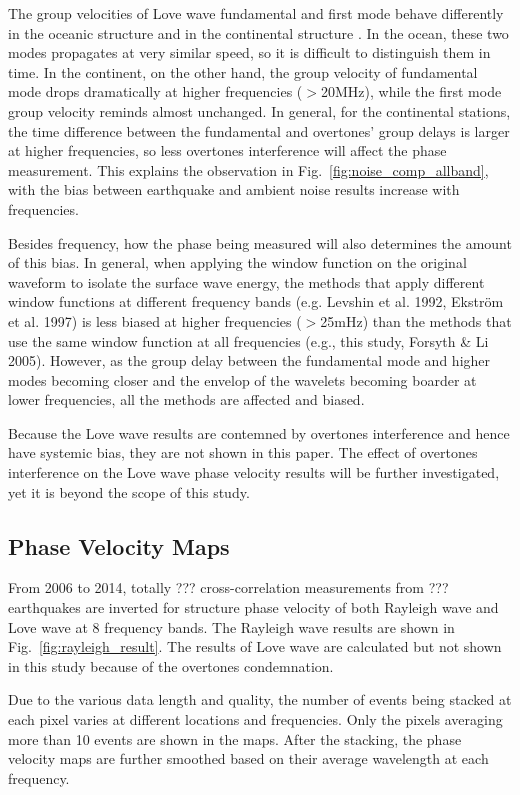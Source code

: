 \documentclass[referee]{gji}
\begin{document}
The group velocities of Love wave fundamental and first mode behave differently in the oceanic structure and in the continental structure \cite{Nettles:2011}. In the ocean, these two modes propagates at very similar speed, so it is difficult to distinguish them in time. In the continent, on the other hand, the group velocity of fundamental mode drops dramatically at higher frequencies ($>$20MHz), while the first mode group velocity reminds almost unchanged. In general, for the continental stations, the time difference between the fundamental and overtones’ group delays is larger at higher frequencies, so less overtones interference will affect the phase measurement. This explains the observation in Fig.~\ref{fig:noise_comp_allband}, with the bias between earthquake and ambient noise results increase with frequencies. 

Besides frequency, how the phase being measured will also determines the amount of this bias. In general, when applying the window function on the original waveform to isolate the surface wave energy, the methods that apply different window functions at different frequency bands (e.g. Levshin et al. 1992, Ekstr\"{o}m et al. 1997) is less biased at higher frequencies ($>$25mHz) than the methods that use the same window function at all frequencies (e.g., this study, Forsyth \& Li 2005). However, as the group delay between the fundamental mode and higher modes becoming closer and the envelop of the wavelets becoming boarder at lower frequencies, all the methods are affected and biased.

Because the Love wave results are contemned by overtones interference and hence have systemic bias, they are not shown in this paper. The effect of overtones interference on the Love wave phase velocity results will be further investigated, yet it is beyond the scope of this study.

\subsection{Phase Velocity Maps}

From 2006 to 2014, totally ??? cross-correlation measurements from ??? earthquakes are inverted for structure phase velocity of both Rayleigh wave and Love wave at 8 frequency bands. The Rayleigh wave results are shown in Fig.~\ref{fig:rayleigh_result}. The results of Love wave are calculated but not shown in this study because of the overtones condemnation. 

Due to the various data length and quality, the number of events being stacked at each pixel varies at different locations and frequencies. Only the pixels averaging more than 10 events are shown in the maps. After the stacking, the phase velocity maps are further smoothed based on their average wavelength at each frequency.
\end{document}
